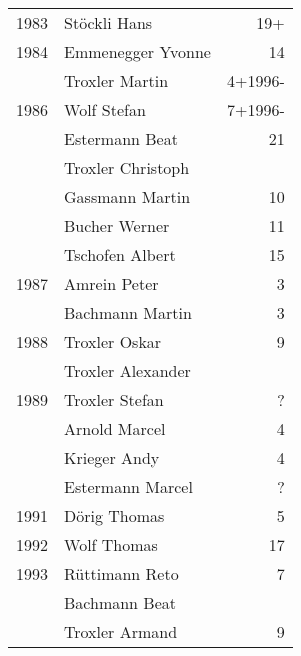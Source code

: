 {\begin{longtable}{ l l r }
        1983          & Stöckli Hans                              & 19+         \\
        1984          & Emmenegger Yvonne                         & 14          \\
                      & Troxler Martin                            & 4+1996-     \\
        1986          & Wolf Stefan                               & 7+1996-     \\
                      & Estermann Beat                            & 21          \\
                      & Troxler Christoph                         &             \\
                      & Gassmann Martin                           & 10          \\
                      & Bucher Werner                             & 11          \\
                      & Tschofen Albert                           & 15          \\
        1987          & Amrein Peter                              & 3           \\
                      & Bachmann Martin                           & 3           \\
        1988          & Troxler Oskar                             & 9           \\
                      & Troxler Alexander                         &             \\
        1989          & Troxler Stefan                            & ?           \\
                      & Arnold Marcel                             & 4           \\
                      & Krieger Andy                              & 4           \\
                      & Estermann Marcel                          & ?           \\
        1991          & Dörig Thomas                              & 5           \\
        1992          & Wolf Thomas                               & 17          \\
        1993          & Rüttimann Reto                            & 7           \\
                      & Bachmann Beat                             &             \\
                      & Troxler Armand                            & 9           \\

\end{longtable}}
